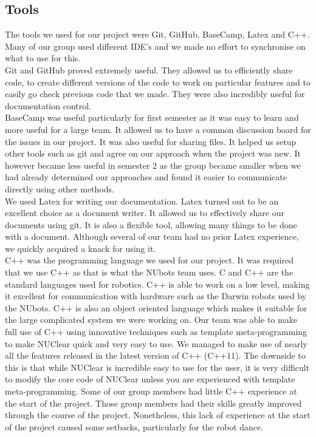 \documentclass[english,12pt]{scrartcl}
\begin{document}
	\subsection{Tools}
		The tools we used for our project were Git, GitHub, BaseCamp, Latex and C++.
		Many of our group used different IDE's and we made no effort to synchronise on what to use for this.
		\\
		Git and GitHub proved extremely useful.
		They allowed us to efficiently share code, to create different versions of the code to work on particular features and to easily go check previous code that we made. They were also incredibly useful for documentation control.
		\\
		BaseCamp was useful particularly for first semester as it was easy to learn and more useful for a large team. 
		It allowed us to have a common discussion board for the issues in our project. It was also useful for sharing files.
		It helped us setup other tools such as git and agree on our approach when the project was new.
		It however became less useful in semester 2 as the group became smaller when we had already determined our approaches and found it easier to communicate directly using other methods.
		\\
		We used Latex for writing our documentation. 
		Latex turned out to be an excellent choice as a document writer. 
		It allowed us to effectively share our documents using git.
		It is also a flexible tool, allowing many things to be done with a document.
		Although several of our team had no prior Latex experience, we quickly acquired a knack for using it.
		\\
		C++ was the programming language we used for our project. 
		It was required that we use C++ as that is what the NUbots team uses. 
		C and C++ are the standard languages used for robotics. 
		C++ is able to work on a low level, making it excellent for communication with hardware such as the Darwin robots used by the NUbots.
		C++ is also an object oriented language which makes it suitable for the large complicated system we were working on.
		Our team was able to make full use of C++ using innovative techniques such as template meta-programming to make NUClear quick and very easy to use.
		We managed to make use of nearly all the features released in the latest version of C++ (C++11).
		The downside to this is that while NUClear is incredible easy to use for the user, it is very difficult to modify the core code of NUClear unless you are experienced with template meta-programming.
		Some of our group members had little C++ experience at the start of the project.
		Those group members had their skills greatly improved through the course of the project.
		Nonetheless, this lack of experience at the start of the project caused some setbacks, particularly for the robot dance.
		
\end{document}
